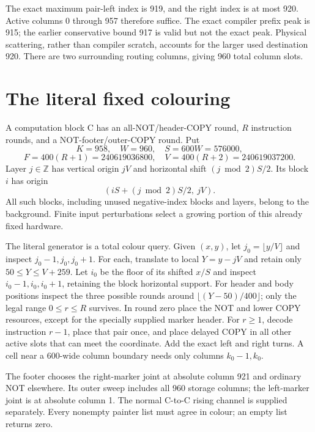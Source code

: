 \documentclass[11pt,letterpaper]{article}
\theoremstyle{definition}\newtheorem{definition}[theorem]{Definition}
\theoremstyle{remark}\newtheorem{remark}[theorem]{Remark}
\newcommand{\Z}{\mathbb Z}\newcommand{\N}{\mathbb N}\newcommand{\Zp}{\mathbb Z_{>0}}
\begin{document}
The exact maximum pair-left index is 919, and the right index is at most 920. Active columns 0 through 957 therefore suffice. The exact compiler prefix peak is 915; the earlier conservative bound 917 is valid but not the exact peak. Physical scattering, rather than compiler scratch, accounts for the larger used destination 920. There are two surrounding routing columns, giving 960 total column slots.

\section{The literal fixed colouring}\label{ptr:la:sec:colouring}
A computation block C has an all-NOT/header-COPY round, $R$ instruction rounds, and a NOT-footer/outer-COPY round. Put
\[
 K=958,\quad W=960,\quad S=600W=576000,
\]
\[
 F=400(R+1)=240619036800,\quad V=400(R+2)=240619037200.
\]
Layer $j\in\Z$ has vertical origin $jV$ and horizontal shift $(j\bmod2)S/2$. Its block $i$ has origin
\[
 (iS+(j\bmod2)S/2,\ jV).
\]
All such blocks, including unused negative-index blocks and layers, belong to the background. Finite input perturbations select a growing portion of this already fixed hardware.

The literal generator is a total colour query. Given $(x,y)$, let $j_0=\lfloor y/V\rfloor$ and inspect $j_0-1,j_0,j_0+1$. For each, translate to local $Y=y-jV$ and retain only $50\le Y\le V+259$. Let $i_0$ be the floor of its shifted $x/S$ and inspect $i_0-1,i_0,i_0+1$, retaining the block horizontal support. For header and body positions inspect the three possible rounds around $\lfloor(Y-50)/400\rfloor$; only the legal range $0\le r\le R$ survives. In round zero place the NOT and lower COPY resources, except for the specially supplied marker header. For $r\ge1$, decode instruction $r-1$, place that pair once, and place delayed COPY in all other active slots that can meet the coordinate. Add the exact left and right turns. A cell near a 600-wide column boundary needs only columns $k_0-1,k_0$.

The footer chooses the right-marker joint at absolute column 921 and ordinary NOT elsewhere. Its outer sweep includes all 960 storage columns; the left-marker joint is at absolute column 1. The normal C-to-C rising channel is supplied separately. Every nonempty painter list must agree in colour; an empty list returns zero.
\end{document}
